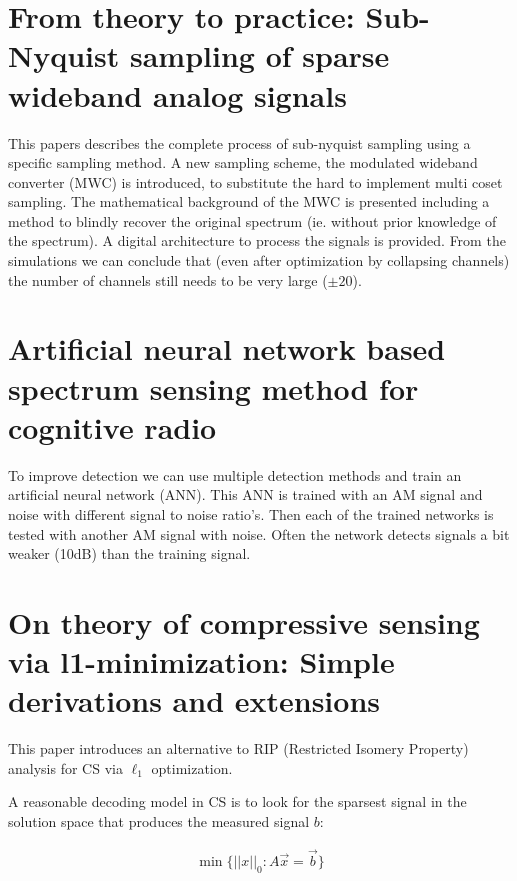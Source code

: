 \documentclass[report, oneside, a4paper, openany]{memoir}
\begin{document}
\section{From theory to practice: Sub-Nyquist sampling of sparse wideband analog signals \cite{mishali2010theory}}
%
This papers describes the complete process of sub-nyquist sampling using a specific sampling method. A new sampling scheme, the modulated wideband converter (MWC) is introduced, to substitute the hard to implement multi coset sampling. The mathematical background of the MWC is presented including a method to blindly recover the original spectrum (ie. without prior knowledge of the spectrum). A digital architecture to process the signals is provided. From the simulations we can conclude that (even after optimization by collapsing channels) the number of channels  still needs to be very large ($\pm20$). 
\section{Artificial neural network based spectrum sensing method for cognitive radio \cite{tang2010artificial}}
%
To improve detection we can use multiple detection methods and train an artificial neural network (ANN). This ANN is trained with an AM signal and noise with different signal to noise ratio's. Then each of the trained networks is tested with another AM signal with noise. Often the network detects signals a bit weaker (10dB) than the training signal.
\section{On theory of compressive sensing via l1-minimization: Simple derivations and extensions \cite{zhang2008theory}}
This paper introduces an alternative to RIP (Restricted Isomery Property) analysis for CS via $\ell_1$ optimization. 


	

A reasonable decoding model in CS is to look for the sparsest signal
in the solution space that produces the measured signal $b$:

\begin{align*}
	\min \{ ||x||_0 : A\vec{x} = \vec{b} \}
\end{align*} 
\end{document}
